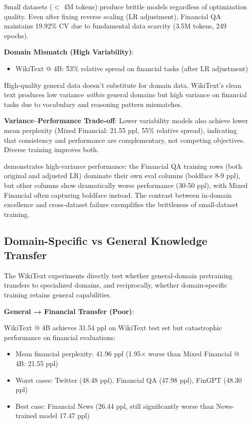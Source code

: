 Small datasets ($<$ 4M tokens) produce brittle models regardless of optimization quality. Even after fixing reverse scaling (LR adjustment), Financial QA maintains 19.92\% CV due to fundamental data scarcity (3.5M tokens, 249 epochs).

\textbf{Domain Mismatch (High Variability)}:
\begin{itemize}
\item WikiText @ 4B: \~53\% relative spread on financial tasks (after LR adjustment)
\end{itemize}

High-quality general data doesn't substitute for domain data. WikiText's clean text produces low variance \textit{within} general domains but high variance on financial tasks due to vocabulary and reasoning pattern mismatches.

\textbf{Variance–Performance Trade-off}: Lower variability models also achieve lower mean perplexity (Mixed Financial: 21.55 ppl, 55\% relative spread), indicating that consistency and performance are complementary, not competing objectives. Diverse training improves both.



 demonstrates high-variance performance: the Financial QA training rows (both original and adjusted LR) dominate their own eval columns (boldface 8-9 ppl), but other columns show dramatically worse performance (30-50 ppl), with Mixed Financial often capturing boldface instead. The contrast between in-domain excellence and cross-dataset failure exemplifies the brittleness of small-dataset training.

\subsection{Domain-Specific vs General Knowledge Transfer}

The WikiText experiments directly test whether general-domain pretraining transfers to specialized domains, and reciprocally, whether domain-specific training retains general capabilities.

\textbf{General → Financial Transfer (Poor)}:

WikiText @ 4B achieves 31.54 ppl on WikiText test set but catastrophic performance on financial evaluations:
\begin{itemize}
\item Mean financial perplexity: 41.96 ppl (1.95$\times$ worse than Mixed Financial @ 4B: 21.55 ppl)
\item Worst cases: Twitter (48.48 ppl), Financial QA (47.98 ppl), FinGPT (48.30 ppl)
\item Best case: Financial News (26.44 ppl, still significantly worse than News-trained model 17.47 ppl)
\end{itemize}

